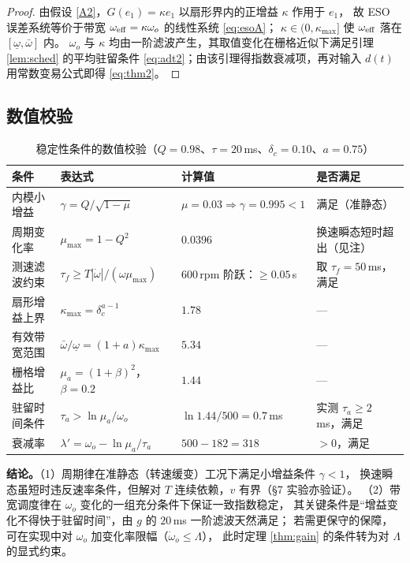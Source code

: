 \documentclass[UTF8,fontset=windows,a4paper,11pt]{ctexart}
\begin{document}
\begin{proof}
由假设 \ref{A2}，$G(e_1)=\kappa e_1$ 以扇形界内的正增益 $\kappa$ 作用于 $e_1$，
故 ESO 误差系统等价于带宽 $\omega_{\rm eff}=\kappa\omega_o$ 的线性系统 \eqref{eq:esoA}；
$\kappa\in(0,\kappa_{\max}]$ 使 $\omega_{\rm eff}$ 落在 $[\underline\omega,\bar\omega]$ 内。
$\omega_o$ 与 $\kappa$ 均由一阶滤波产生，其取值变化在栅格近似下满足引理 \ref{lem:sched} 的平均驻留条件
\eqref{eq:adt2}；由该引理得指数衰减项，再对输入 $d(t)$ 用常数变易公式即得 \eqref{eq:thm2}。
\end{proof}

\subsection{数值校验}
\label{app:num}

\begin{table}[H]
\centering
\caption{稳定性条件的数值校验（$Q=0.98$、$\tau=20$\,ms、$\delta_c=0.10$、$a=0.75$）}
\begin{tabular}{@{}llll@{}}
\toprule
条件 & 表达式 & 计算值 & 是否满足 \\
\midrule
内模小增益 & $\gamma=Q/\sqrt{1-\mu}$ & $\mu=0.03\Rightarrow\gamma=0.995<1$ & 满足（准静态） \\
周期变化率 & $\mu_{\max}=1-Q^{2}$ & $0.0396$ & 换速瞬态短时超出（见注） \\
测速滤波约束 & $\tau_f\ge T|\dot\omega|/(\omega\mu_{\max})$ & $600$\,rpm 阶跃：$\ge0.05$\,s & 取 $\tau_f=50$\,ms，满足 \\
扇形增益上界 & $\kappa_{\max}=\delta_c^{a-1}$ & $1.78$ & --- \\
有效带宽范围 & $\bar\omega/\underline\omega=(1+a)\kappa_{\max}$ & $5.34$ & --- \\
栅格增益比 & $\mu_a=(1+\beta)^{2}$，$\beta=0.2$ & $1.44$ & --- \\
驻留时间条件 & $\tau_a>\ln\mu_a/\omega_o$ & $\ln1.44/500=0.7$\,ms & 实测 $\tau_a\ge2$\,ms，满足 \\
衰减率 & $\lambda'=\omega_o-\ln\mu_a/\tau_a$ & $500-182=318$ & $>0$，满足 \\
\bottomrule
\end{tabular}
\end{table}

\textbf{结论。}（1）周期律在准静态（转速缓变）工况下满足小增益条件 $\gamma<1$，
换速瞬态虽短时违反速率条件，但解对 $T$ 连续依赖，$v$ 有界（\S 7 实验亦验证）。
（2）带宽调度律在 $\omega_o$ 变化的一组充分条件下保证一致指数稳定，
其关键条件是“增益变化不得快于驻留时间”，由 $g$ 的 $20$\,ms 一阶滤波天然满足；
若需更保守的保障，可在实现中对 $\omega_o$ 加变化率限幅（$\dot\omega_o\le\Lambda$），
此时定理 \ref{thm:gain} 的条件转为对 $\Lambda$ 的显式约束。
\end{document}
